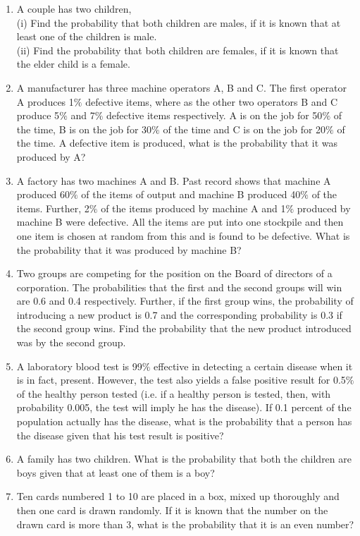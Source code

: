 \begin{enumerate}[label=\thesection.\arabic*.,ref=\thesection.\theenumi]
\item A couple has two children,\\
(i) Find the probability that both children are males, if it is known that at least one of the children is male.\\
(ii) Find the probability that both children are females, if it is known that the elder child is a female.\\
\item A manufacturer has three machine operators A, B and C. The first operator A
produces 1$\%$ defective items, where as the other two operators B and C produce 5$\%$ and 7$\%$ defective items respectively. A is on the job for 50$\%$ of the time, B is on the job for 30$\%$ of the time and C is on the job for 20$\%$ of the time. A defective item is produced, what is the probability that it was produced by A?\\
\solution


\item A factory has two machines A and B. Past record shows that machine A produced 60$\%$ of the items of output and machine B produced 40$\%$ of the items. Further, 2$\%$ of the items produced by machine A and 1$\%$ produced by machine B were defective. All the items are put into one stockpile and then one item is chosen at random from this and is found to be defective. What is the probability that it was produced by machine B?\\
%
\solution

\item Two groups are competing for the position on the Board of directors of a corporation. The probabilities that the first and the second groups will win are 0.6 and 0.4 respectively. Further, if the first group wins, the probability of introducing a new product is 0.7 and the corresponding probability is 0.3 if the second group wins. Find the probability that the new product introduced was by the second group.\\
\item A laboratory blood test is 99$\%$ effective in detecting a certain disease when it is in fact, present. However, the test also yields a false positive result for 0.5$\%$ of the healthy person tested (i.e. if a healthy person is tested, then, with probability 0.005, the test will imply he has the disease). If 0.1 percent of the population actually has the disease, what is the probability that a person has the disease given that his test result is positive?\\
\item A family has two children. What is the probability that both the children are boys given that at least one of them is a boy?\\
%
\solution

\item Ten cards numbered 1 to 10 are placed in a box, mixed up thoroughly and then one card is drawn randomly. If it is known that the number on the drawn card is more than 3, what is the probability that it is an even number?\\


\end{enumerate}
